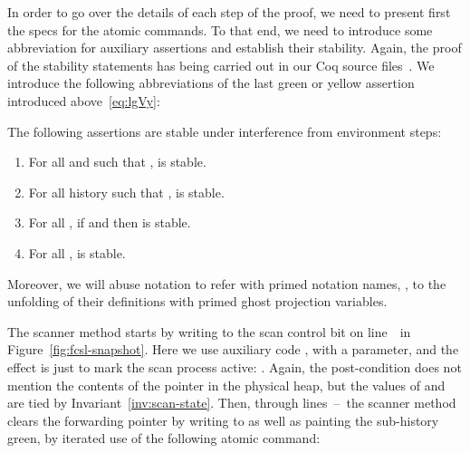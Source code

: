 In order to go over the details of each step of the proof, we need to
present first the specs for the atomic commands. To that end, we need
to introduce some abbreviation for auxiliary assertions and establish
their stability. Again, the proof of the stability statements has
being carried out in our Coq source files~\cite{CoqFiles}. We
introduce the following abbreviations of the last green or yellow
assertion introduced above~\eqref{eq:lgVy}:


\begin{lemma}\label{lem:menvs-scan}
The following assertions are stable under interference from
environment steps:
\begin{enumerate}
 \item \label{lem:menvs:green-phist} For all  and
    such that ,  is stable.

 \item\label{lem:menvs:green-subhist} For all history  such that ,  is stable.

 \item \label{lem:menvs:some-lgVy} For all , if  and  then  is stable.

 \item \label{lem:menvs:none-lgVy} For all ,
    is stable.
\end{enumerate}
Moreover, we will abuse notation to refer with primed notation names,
\eg , to the unfolding of their definitions with primed
ghost projection variables.
\end{lemma}








The scanner method starts by writing to the scan control bit  on
line~\lineScanSetsS\ in Figure~\ref{fig:fcsl-snapshot}. Here we use
auxiliary code , with a  parameter, and the
effect is just to mark the scan process active: . Again,
the post-condition does not mention the contents of the pointer  in
the physical heap, but the values of  and  are tied by
Invariant~\ref{inv:scan-state}. Then, through
lines~\lineScanClearsX--\lineScanClearsY~the scanner method clears the
forwarding pointer by writing  to  as well as painting
the sub-history  green, by iterated use of the following
atomic command:



